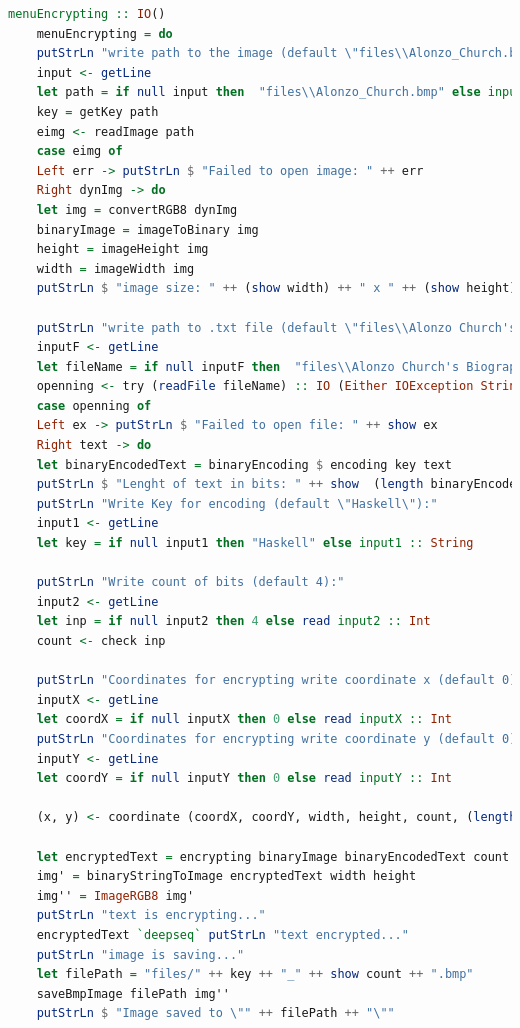 \documentclass[10pt,a4paper,final]{article} %
\begin{document}
\begin{lstlisting}[language=Haskell, caption=Шифрование текста]
	menuEncrypting :: IO()
	menuEncrypting = do
	putStrLn "write path to the image (default \"files\\Alonzo_Church.bmp\")"
	input <- getLine
	let path = if null input then  "files\\Alonzo_Church.bmp" else input :: String
	key = getKey path
	eimg <- readImage path
	case eimg of
	Left err -> putStrLn $ "Failed to open image: " ++ err
	Right dynImg -> do 
	let img = convertRGB8 dynImg   
	binaryImage = imageToBinary img
	height = imageHeight img
	width = imageWidth img
	putStrLn $ "image size: " ++ (show width) ++ " x " ++ (show height)
	
	putStrLn "write path to .txt file (default \"files\\Alonzo Church's Biography.txt\")"
	inputF <- getLine
	let fileName = if null inputF then  "files\\Alonzo Church's Biography.txt" else inputF :: String
	openning <- try (readFile fileName) :: IO (Either IOException String)
	case openning of
	Left ex -> putStrLn $ "Failed to open file: " ++ show ex
	Right text -> do
	let binaryEncodedText = binaryEncoding $ encoding key text
	putStrLn $ "Lenght of text in bits: " ++ show  (length binaryEncodedText)
	putStrLn "Write Key for encoding (default \"Haskell\"):"
	input1 <- getLine
	let key = if null input1 then "Haskell" else input1 :: String
	
	putStrLn "Write count of bits (default 4):"
	input2 <- getLine
	let inp = if null input2 then 4 else read input2 :: Int
	count <- check inp 
	
	putStrLn "Coordinates for encrypting write coordinate x (default 0):"
	inputX <- getLine
	let coordX = if null inputX then 0 else read inputX :: Int
	putStrLn "Coordinates for encrypting write coordinate y (default 0):"
	inputY <- getLine
	let coordY = if null inputY then 0 else read inputY :: Int
	
	(x, y) <- coordinate (coordX, coordY, width, height, count, (length binaryEncodedText))
	
	let encryptedText = encrypting binaryImage binaryEncodedText count x y
	img' = binaryStringToImage encryptedText width height
	img'' = ImageRGB8 img'
	putStrLn "text is encrypting..."
	encryptedText `deepseq` putStrLn "text encrypted..."
	putStrLn "image is saving..."
	let filePath = "files/" ++ key ++ "_" ++ show count ++ ".bmp"
	saveBmpImage filePath img''
	putStrLn $ "Image saved to \"" ++ filePath ++ "\""
\end{lstlisting}
\end{document}

